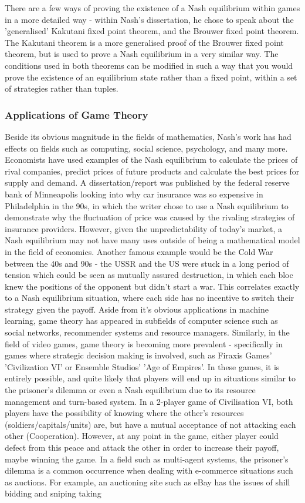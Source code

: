\documentclass[12pt,a4paper]{article}
\begin{document}
\noindent
There are a few ways of proving the existence of a Nash equilibrium within games in a more detailed way - within Nash's dissertation, he chose to speak about the 'generalised' Kakutani fixed point theorem\cite{15}, and the Brouwer fixed point theorem. The Kakutani theorem is a more generalised proof of the Brouwer fixed point theorem, but is used to prove a Nash equilibrium in a very similar way. The conditions used in both theorems can be modified in such a way that you would prove the existence of an equilibrium state rather than a fixed point, within a set of strategies rather than tuples.

\subsubsection{Applications of Game Theory}
Beside its obvious magnitude in the fields of mathematics, Nash's work has had effects on fields such as computing, social science, psychology, and many more. Economists have used examples of the Nash equilibrium to calculate the prices of rival companies, predict prices of future products and calculate the best prices for supply and demand. A dissertation/report was published by the federal reserve bank of Minneapolis looking into why car insurance was so expensive in Philadelphia in the 90s, in which the writer chose to use a Nash equilibrium to demonstrate why the fluctuation of price was caused by the rivaling strategies of insurance providers. However, given the unpredictability of today's market, a Nash equilibrium may not have many uses outside of being a mathematical model in the field of economics. Another famous example would be the Cold War between the 40s and 90s - the USSR and the US were stuck in a long period of tension which could be seen as mutually assured destruction, in which each bloc knew the positions of the opponent but didn't start a war. This correlates exactly to a Nash equilibrium situation, where each side has no incentive to switch their strategy given the payoff.  Aside from it's obvious applications in machine learning, game theory has appeared in subfields of computer science such as social networks, recommender systems and resource managers. Similarly, in the field of video games, game theory is becoming more prevalent - specifically in games where strategic decision making is involved, such as Firaxis Games' 'Civilization VI' or Ensemble Studios' 'Age of Empires'. In these games, it is entirely possible, and quite likely that players will end up in situations similar to the prisoner's dilemma or even a Nash equilibrium due to its resource management and turn-based system. In a 2-player game of Civilisation VI, both players have the possibility of knowing where the other's resources (soldiers/capitals/units) are, but have a mutual acceptance of not attacking each other (Cooperation). However, at any point in the game, either player could defect from this peace and attack the other in order to increase their payoff, maybe winning the game. In a field such as multi-agent systems, the prisoner's dilemma is a common occurrence when dealing with e-commerce situations such as auctions. For example, an auctioning site such as eBay has the issues of shill bidding and sniping taking 
\end{document}
